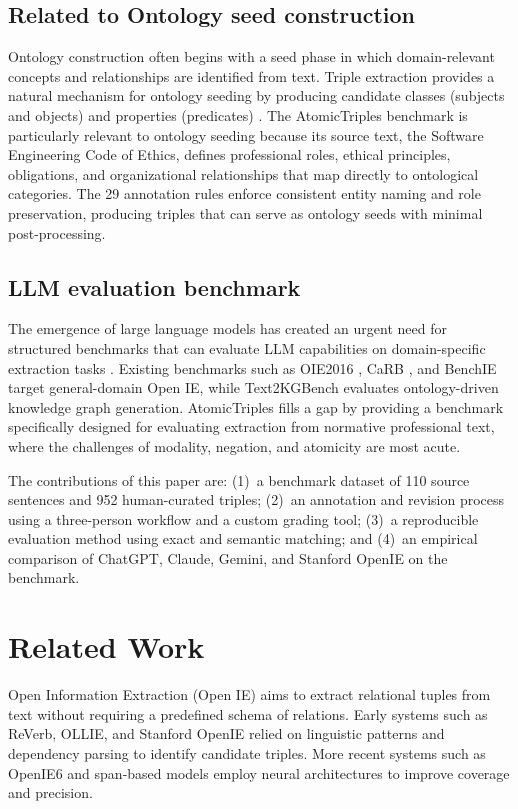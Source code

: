 \documentclass[conference]{IEEEtran}
\begin{document}
\subsection{Related to Ontology seed construction}
Ontology construction often begins with a seed phase in which domain-relevant concepts and relationships are identified from text. Triple extraction provides a natural mechanism for ontology seeding by producing candidate classes (subjects and objects) and properties (predicates) \cite{vergara2023schematic}. The AtomicTriples benchmark is particularly relevant to ontology seeding because its source text, the Software Engineering Code of Ethics, defines professional roles, ethical principles, obligations, and organizational relationships that map directly to ontological categories. The 29 annotation rules enforce consistent entity naming and role preservation, producing triples that can serve as ontology seeds with minimal post-processing.

\subsection{LLM evaluation benchmark}
The emergence of large language models has created an urgent need for structured benchmarks that can evaluate LLM capabilities on domain-specific extraction tasks \cite{pan2024unifying}. Existing benchmarks such as OIE2016 \cite{stanovsky2016creating}, CaRB \cite{bhardwaj2019carb}, and BenchIE \cite{gashteovski2022benchie} target general-domain Open IE, while Text2KGBench \cite{mihindukulasooriya2023text2kgbench} evaluates ontology-driven knowledge graph generation. AtomicTriples fills a gap by providing a benchmark specifically designed for evaluating extraction from normative professional text, where the challenges of modality, negation, and atomicity are most acute.

The contributions of this paper are: (1)~a benchmark dataset of 110 source sentences and 952 human-curated triples; (2)~an annotation and revision process using a three-person workflow and a custom grading tool; (3)~a reproducible evaluation method using exact and semantic matching; and (4)~an empirical comparison of ChatGPT, Claude, Gemini, and Stanford OpenIE on the benchmark.


\section{Related Work}

Open Information Extraction (Open IE) aims to extract relational tuples from text without requiring a predefined schema of relations. Early systems such as ReVerb, OLLIE, and Stanford OpenIE \cite{angeli2015leveraging} relied on linguistic patterns and dependency parsing to identify candidate triples. More recent systems such as OpenIE6 \cite{kolluru2020openie6} and span-based models \cite{zhan2020span} employ neural architectures to improve coverage and precision.
\end{document}
